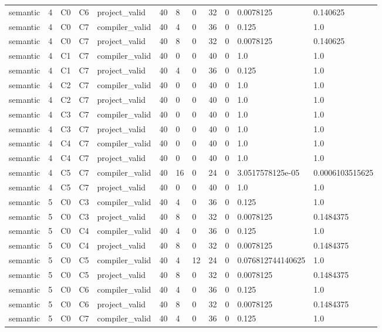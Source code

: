 \begin{tabular}{llllllllllll}
semantic & 4 & C0 & C6 & project\_valid & 40 & 8 & 0 & 32 & 0 & 0.0078125 & 0.140625 \\
semantic & 4 & C0 & C7 & compiler\_valid & 40 & 4 & 0 & 36 & 0 & 0.125 & 1.0 \\
semantic & 4 & C0 & C7 & project\_valid & 40 & 8 & 0 & 32 & 0 & 0.0078125 & 0.140625 \\
semantic & 4 & C1 & C7 & compiler\_valid & 40 & 0 & 0 & 40 & 0 & 1.0 & 1.0 \\
semantic & 4 & C1 & C7 & project\_valid & 40 & 4 & 0 & 36 & 0 & 0.125 & 1.0 \\
semantic & 4 & C2 & C7 & compiler\_valid & 40 & 0 & 0 & 40 & 0 & 1.0 & 1.0 \\
semantic & 4 & C2 & C7 & project\_valid & 40 & 0 & 0 & 40 & 0 & 1.0 & 1.0 \\
semantic & 4 & C3 & C7 & compiler\_valid & 40 & 0 & 0 & 40 & 0 & 1.0 & 1.0 \\
semantic & 4 & C3 & C7 & project\_valid & 40 & 0 & 0 & 40 & 0 & 1.0 & 1.0 \\
semantic & 4 & C4 & C7 & compiler\_valid & 40 & 0 & 0 & 40 & 0 & 1.0 & 1.0 \\
semantic & 4 & C4 & C7 & project\_valid & 40 & 0 & 0 & 40 & 0 & 1.0 & 1.0 \\
semantic & 4 & C5 & C7 & compiler\_valid & 40 & 16 & 0 & 24 & 0 & 3.0517578125e-05 & 0.0006103515625 \\
semantic & 4 & C5 & C7 & project\_valid & 40 & 0 & 0 & 40 & 0 & 1.0 & 1.0 \\
semantic & 5 & C0 & C3 & compiler\_valid & 40 & 4 & 0 & 36 & 0 & 0.125 & 1.0 \\
semantic & 5 & C0 & C3 & project\_valid & 40 & 8 & 0 & 32 & 0 & 0.0078125 & 0.1484375 \\
semantic & 5 & C0 & C4 & compiler\_valid & 40 & 4 & 0 & 36 & 0 & 0.125 & 1.0 \\
semantic & 5 & C0 & C4 & project\_valid & 40 & 8 & 0 & 32 & 0 & 0.0078125 & 0.1484375 \\
semantic & 5 & C0 & C5 & compiler\_valid & 40 & 4 & 12 & 24 & 0 & 0.076812744140625 & 1.0 \\
semantic & 5 & C0 & C5 & project\_valid & 40 & 8 & 0 & 32 & 0 & 0.0078125 & 0.1484375 \\
semantic & 5 & C0 & C6 & compiler\_valid & 40 & 4 & 0 & 36 & 0 & 0.125 & 1.0 \\
semantic & 5 & C0 & C6 & project\_valid & 40 & 8 & 0 & 32 & 0 & 0.0078125 & 0.1484375 \\
semantic & 5 & C0 & C7 & compiler\_valid & 40 & 4 & 0 & 36 & 0 & 0.125 & 1.0 \\

\end{tabular}
